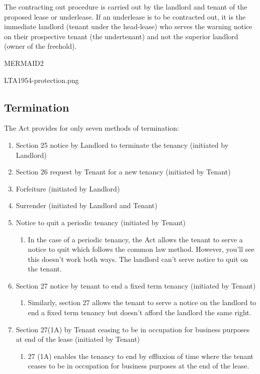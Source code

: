 \documentclass[
]{article}
\providecommand{\tightlist}{%
  \setlength{\itemsep}{0pt}\setlength{\parskip}{0pt}}
\begin{document}
The contracting out procedure is carried out by the landlord and tenant
of the proposed lease or underlease. If an underlease is to be
contracted out, it is the immediate landlord (tenant under the
head-lease) who serves the warning notice on their prospective tenant
(the undertenant) and not the superior landlord (owner of the freehold).

MERMAID2

LTA1954-protection.png

\hypertarget{termination-1}{%
\subsection{Termination}\label{termination-1}}

The Act provides for only seven methods of termination:

\begin{enumerate}
\tightlist
\item
  Section 25 notice by Landlord to terminate the tenancy (initiated by
  Landlord)
\item
  Section 26 request by Tenant for a new tenancy (initiated by Tenant)
\item
  Forfeiture (initiated by Landlord)
\item
  Surrender (initiated by Landlord and Tenant)
\item
  Notice to quit a periodic tenancy (initiated by Tenant)

  \begin{enumerate}
  \tightlist
  \item
    In the case of a periodic tenancy, the Act allows the tenant to
    serve a notice to quit which follows the common law method. However,
    you'll see this doesn't work both ways. The landlord can't serve
    notice to quit on the tenant.
  \end{enumerate}
\item
  Section 27 notice by tenant to end a fixed term tenancy (initiated by
  Tenant)

  \begin{enumerate}
  \tightlist
  \item
    Similarly, section 27 allows the tenant to serve a notice on the
    landlord to end a fixed term tenancy but doesn't afford the landlord
    the same right.
  \end{enumerate}
\item
  Section 27(1A) by Tenant ceasing to be in occupation for business
  purposes at end of the lease (initiated by Tenant)

  \begin{enumerate}
  \tightlist
  \item
    27 (1A) enables the tenancy to end by effluxion of time where the
    tenant ceases to be in occupation for business purposes at the end
    of the lease.
  \end{enumerate}
\end{enumerate}
\end{document}
